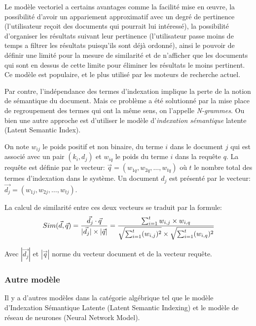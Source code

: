 Le modèle vectoriel a certains avantages comme la facilité mise en œuvre, la possibilité d'avoir un appariement approximatif avec un degré de pertinence (l'utilisateur reçoit des documents qui pourrait lui intéressé), la possibilité d'organiser les résultats suivant leur pertinence (l'utilisateur passe moins de temps a filtrer les résultats puisqu'ils sont déjà ordonné), ainsi le pouvoir de définir une limité pour la mesure de similarité et de n'afficher que les documents qui sont en dessus de cette limite pour éliminer les résultats le moins pertinent. Ce modèle est populaire, et le plus utilisé par les moteurs de recherche actuel. \citep*{approche-semantique, modern-ir, soulier2014:def-evaluation-modele}

Par contre, l’indépendance des termes d'indexation implique la perte de la notion de sémantique du document. Mais ce problème a été solutionné par la mise place de regroupement des termes qui ont la même sens, on l'appelle \emph{N-grammes}. Ou bien une autre approche est d'utiliser le modèle d’\emph{indexation sémantique} latente (Latent Semantic Index).

\begin{definition}
    On note $w_{ij}$ le poids positif et non binaire, du terme $i$ dans le document $j$ qui est associé avec un pair $(k_{i}, d_{j})$ et $w_{iq}$ le poids du terme $i$ dans la requête $q$. La requête est définie par le vecteur: $ \vec{q} = (w_{1q}, w_{2q}, \dots, w_{tq}) $ où $t$ le nombre total des termes d'indexation dans le système. Un document $d_{j}$ est présenté par le vecteur: $ \vec{d_{j}} = (w_{1j}, w_{2j}, \dots, w_{tj}) $.

    La calcul de similarité entre ces deux vecteurs se traduit par la formule:
    \[
        Sim(\vec{d}, \vec{q}) = \frac{\vec{d_{j}} \cdot \vec{q}}{ |\vec{d_{j}}| \times |\vec{q}| } \\
        = \frac{\sum_{i=1}^{t} w_{i,j} \times w_{i,q}}{\sqrt{\sum_{i=1}^{t} (w_{i,j})^2} \times \sqrt{\sum_{i=1}^{t} (w_{i,q})^2}}
    \]

    Avec $ |\vec{d_{j}}| $ et $ |\vec{q}| $ norme du vecteur document et de la vecteur requête.
\end{definition}

\subsubsection{Autre modèle}
Il y a d'autres modèles dans la catégorie algébrique tel que le modèle d'Indexation Sémantique Latente (Latent Semantic Indexing) et le modèle de réseau de neurones (Neural Network Model).


